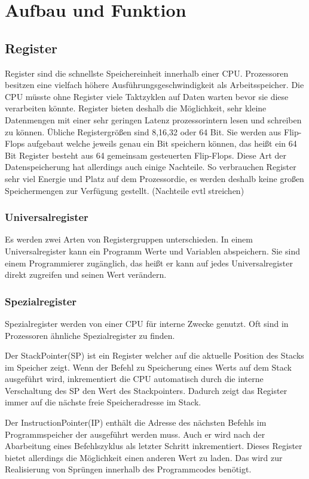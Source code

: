 \documentclass[12pt]{article}
\begin{document}
\section{Aufbau und Funktion}
\subsection{Register}
Register sind die schnellste Speichereinheit innerhalb einer CPU. Prozessoren besitzen eine vielfach höhere Ausführungsgeschwindigkeit als Arbeitsspeicher. Die CPU müsste ohne Register viele Taktzyklen auf Daten warten bevor sie diese verarbeiten könnte. Register bieten deshalb die Möglichkeit, sehr kleine Datenmengen mit einer sehr geringen Latenz prozessorintern lesen und schreiben zu können. Übliche Registergrößen sind 8,16,32 oder 64 Bit.\cite{mikroprozessortechnik2011} Sie werden aus Flip-Flops aufgebaut welche jeweils genau ein Bit speichern können, das heißt ein 64 Bit Register besteht aus 64 gemeinsam gesteuerten Flip-Flops.\cite{mikroprozessortechnik2011} Diese Art der Datenspeicherung hat allerdings auch einige Nachteile. So verbrauchen Register sehr viel Energie und Platz auf dem Prozessordie, es werden deshalb keine großen Speichermengen zur Verfügung gestellt. (Nachteile evtl streichen)

\subsubsection{Universalregister}
Es werden zwei Arten von Registergruppen unterschieden. In einem Universalregister kann ein Programm Werte und Variablen abspeichern. Sie sind einem Programmierer zugänglich, das heißt er kann auf jedes Universalregister direkt zugreifen und seinen Wert verändern.

\subsubsection{Spezialregister}
Spezialregister werden von einer CPU für interne Zwecke genutzt. Oft sind in Prozessoren ähnliche Spezialregister zu finden. 

Der StackPointer(SP) ist ein Register welcher auf die aktuelle Position des Stacks im Speicher zeigt. Wenn der Befehl zu Speicherung eines Werts auf dem Stack ausgeführt wird, inkrementiert die CPU automatisch durch die interne Verschaltung des SP den Wert des Stackpointers. Dadurch zeigt das Register immer auf die nächste freie Speicheradresse im Stack.

Der InstructionPointer(IP) enthält die Adresse des nächsten Befehls im Programmspeicher der ausgeführt werden muss. Auch er wird nach der Abarbeitung eines Befehlszyklus als letzter Schritt inkrementiert. Dieses Register bietet allerdings die Möglichkeit einen anderen Wert zu laden. Das wird zur Realisierung von Sprüngen innerhalb des Programmcodes benötigt. 
\end{document}
